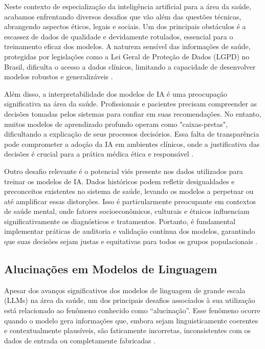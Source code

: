 Neste contexto de especialização da inteligência artificial para a área da saúde, acabamos enfrentando diversos desafios que vão além das questões técnicas, abrangendo aspectos éticos, legais e sociais. Um dos principais obstáculos é a escassez de dados de qualidade e devidamente rotulados, essencial para o treinamento eficaz dos modelos. A natureza sensível das informações de saúde, protegidas por legislações como a Lei Geral de Proteção de Dados (LGPD) no Brasil, dificulta o acesso a dados clínicos, limitando a capacidade de desenvolver modelos robustos e generalizáveis \cite{gee2024inteligencia}.

Além disso, a interpretabilidade dos modelos de IA é uma preocupação significativa na área da saúde. Profissionais e pacientes precisam compreender as decisões tomadas pelos sistemas para confiar em suas recomendações. No entanto, muitos modelos de aprendizado profundo operam como "caixas-pretas", dificultando a explicação de seus processos decisórios. Essa falta de transparência pode comprometer a adoção da IA em ambientes clínicos, onde a justificativa das decisões é crucial para a prática médica ética e responsável \cite{silva2023desafios}.

Outro desafio relevante é o potencial viés presente nos dados utilizados para treinar os modelos de IA. Dados históricos podem refletir desigualdades e preconceitos existentes no sistema de saúde, levando os modelos a perpetuar ou até amplificar essas distorções. Isso é particularmente preocupante em contextos de saúde mental, onde fatores socioeconômicos, culturais e étnicos influenciam significativamente os diagnósticos e tratamentos. Portanto, é fundamental implementar práticas de auditoria e validação contínua dos modelos, garantindo que suas decisões sejam justas e equitativas para todos os grupos populacionais \cite{souza2024desafios}.

\subsection{Alucinações em Modelos de Linguagem}

Apesar dos avanços significativos dos modelos de linguagem de grande escala (LLMs) na área da saúde, um dos principais desafios associados à sua utilização está relacionado ao fenômeno conhecido como “alucinação”. Esse fenômeno ocorre quando o modelo gera informações que, embora sejam linguisticamente coerentes e contextualmente plausíveis, são faticamente incorretas, inconsistentes com os dados de entrada ou completamente fabricadas \cite{ji2023survey}.

